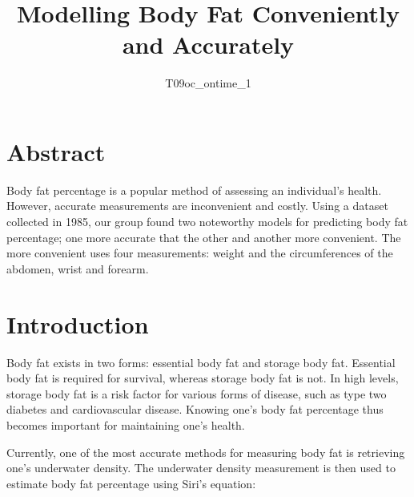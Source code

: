 \documentclass[letterpaper,9pt,twocolumn,twoside,]{pinp}
\title{Modelling Body Fat Conveniently and Accurately}
\author[]{T09oc\_ontime\_1}
\affil[]{The University of Sydney, Camperdown, NSW, 2006}
\begin{document}
\verticaladjustment{-2pt}

\maketitle
\thispagestyle{firststyle}



\hypertarget{abstract}{%
\section{Abstract}\label{abstract}}

Body fat percentage is a popular method of assessing an individual's
health. However, accurate measurements are inconvenient and costly.
Using a dataset collected in 1985, our group found two noteworthy models
for predicting body fat percentage; one more accurate that the other and
another more convenient. The more convenient uses four measurements:
weight and the circumferences of the abdomen, wrist and forearm.

\hypertarget{introduction}{%
\section{Introduction}\label{introduction}}

Body fat exists in two forms: essential body fat and storage body fat.
Essential body fat is required for survival, whereas storage body fat is
not. In high levels, storage body fat is a risk factor for various forms
of disease, such as type two diabetes and cardiovascular disease.
Knowing one's body fat percentage thus becomes important for maintaining
one's health.

Currently, one of the most accurate methods for measuring body fat is
retrieving one's underwater density. The underwater density measurement
is then used to estimate body fat percentage using Siri's equation:
\end{document}
